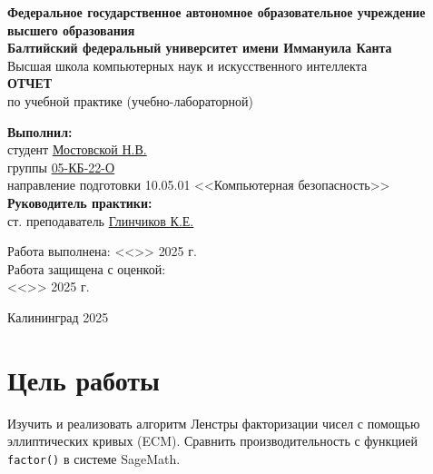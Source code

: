 \documentclass[12pt,a4paper]{article}
\begin{document}
\begin{titlepage}
    \centering
    {\large\textbf{Федеральное государственное автономное образовательное учреждение высшего образования}}\\[0.5cm]
    {\large\textbf{Балтийский федеральный университет имени Иммануила Канта}}\\[0.5cm]
    {\large Высшая школа компьютерных наук и искусственного интеллекта}\\[3cm]
    {\Large\textbf{ОТЧЕТ}}\\[1cm]
    {\Large по учебной практике (учебно-лабораторной)}\\[2cm]
    \begin{flushright}
        \large
        \textbf{Выполнил:}\\
        студент \underline{Мостовской Н.В.}\\[0.5cm]
        группы \underline{05-КБ-22-О}\\[0.5cm]
        направление подготовки 10.05.01 <<Компьютерная безопасность>>\\[2cm]
        \textbf{Руководитель практики:}\\
        ст. преподаватель \underline{Глинчиков К.Е.}\\[2cm]
    \end{flushright}
    \begin{flushright}
        Работа выполнена: <<\underline{\hspace{1cm}}>> \underline{\hspace{3cm}} 2025 г.\\[1cm]
        Работа защищена с оценкой: \underline{\hspace{6cm}}\\[1cm]
        <<\underline{\hspace{1cm}}>> \underline{\hspace{3cm}} 2025 г.\\
    \end{flushright}
    \vfill
    {\large Калининград 2025}
\end{titlepage}

\newpage

\section*{Цель работы}
Изучить и реализовать алгоритм Ленстры факторизации чисел с помощью эллиптических кривых (ECM). Сравнить производительность с функцией \texttt{factor()} в системе SageMath.
\end{document}
